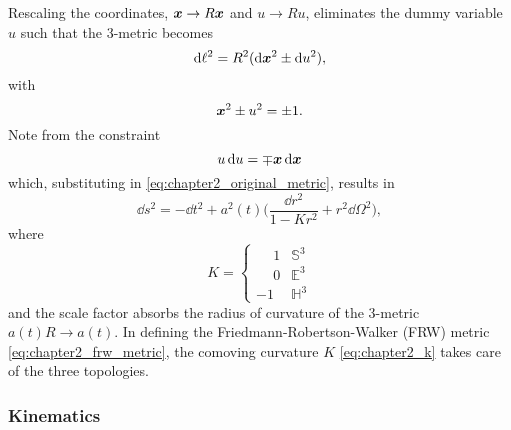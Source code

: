\noindent
Rescaling the coordinates, \(\vb*{x} \rightarrow R\vb*{x}\) and \(u \rightarrow Ru\), eliminates the dummy variable \(u\) such that the 3-metric becomes
%
\begin{equation}
	\dd{\ell^{2}}
	= R^{2} (\dd{\vb*{x}^{2}} \pm \dd{u^{2}}),
\end{equation}
%
with
%
\begin{equation}
	\vb*{x}^{2} \pm u^{2}
	= \pm 1.
\end{equation}
%
Note from the constraint
%
\begin{equation}
	u\dd{u}
	= \mp \vb*{x}\dd{\vb*{x}}
\end{equation}
%
which, substituting in \cref{eq:chapter2_original_metric}, results in
%
\begin{equation}\label{eq:chapter2_frw_metric}
	\dd{s^{2}}
	= -\dd{t^{2}} + a^{2}(t) \bigg( \frac{\dd{r^{2}}}{1-Kr^{2}} + r^{2}\dd{\Omega^{2}} \bigg),
\end{equation}
%
where
%
\begin{equation}\label{eq:chapter2_k}
	K =
	\begin{cases}
		\mathbin{\phantom{-}}1 & \mathbb{S}^{3} \\
		\mathbin{\phantom{-}}0 & \mathbb{E}^{3} \\
		-1                     & \mathbb{H}^{3}
	\end{cases}
\end{equation}
%
and the scale factor absorbs the radius of curvature of the 3-metric \(a(t)R \rightarrow a(t)\).
In defining the Friedmann-Robertson-Walker (FRW) metric \cref{eq:chapter2_frw_metric}, the comoving curvature \(K\) \cref{eq:chapter2_k} takes care of the three topologies.

\subsubsection{Kinematics}


